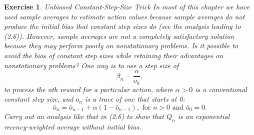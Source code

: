 \documentclass[answers]{exam}
\newtheorem{exercise}[theorem]{Exercise}
\theoremstyle{definition}
\theoremstyle{remark}
\newcommand{\tand}{\text{ and }}
\begin{document}
\begin{exercise}
Unbiased Constant-Step-Size Trick In most of this chapter we have used sample averages to estimate action values because sample averages do not produce the initial bias that constant step sizes do (see the analysis leading to (2.6)). However, sample averages are not a completely satisfactory solution because they may perform poorly on nonstationary problems. Is it possible to avoid the bias of constant step sizes while retaining their advantages on nonstationary problems? One way is to use a step size of    
\begin{equation}
\beta_{n}=\frac{\alpha}{\bar{o}_{n}},    
\end{equation}
to process the nth reward for a particular action, where $\alpha>0$ is a conventional constant step size, and $\bar{o}_{n}$ is a trace of one that starts at 0:
\begin{equation}\label{tracerecursion}
\bar{o}_{n} = \bar{o}_{n-1} + \alpha(1 - \bar{o}_{n-1}), \text{ for }n > 0\tand \bar{o}_{0} = 0. 
\end{equation}
Carry out an analysis like that in (2.6) to show that $Q_n$ is an exponential recency-weighted average without initial bias.
\end{exercise}
\end{document}
